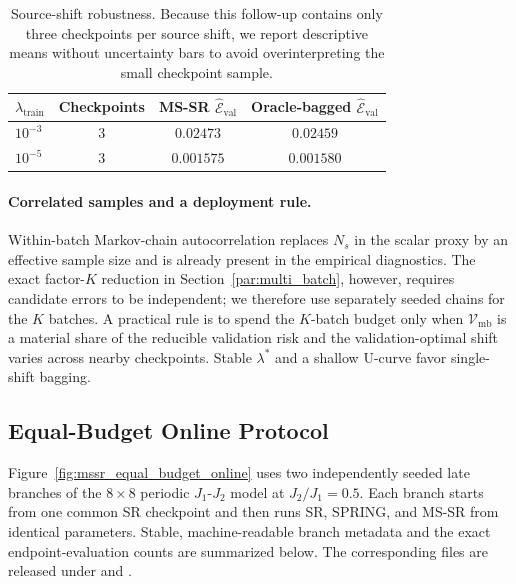 \begin{table}[h]
\centering
\small
\begin{tabular}{lccc}
\toprule
$\lambda_{\mathrm{train}}$ & Checkpoints
  & MS-SR $\widehat{\mathcal E}_{\mathrm{val}}$
  & Oracle-bagged $\widehat{\mathcal E}_{\mathrm{val}}$ \\
\midrule
$10^{-3}$ & 3 & $0.02473$ & $0.02459$ \\
$10^{-5}$ & 3 & $0.001575$ & $0.001580$ \\
\bottomrule
\end{tabular}
\caption{Source-shift robustness. Because this follow-up contains only three
checkpoints per source shift, we report descriptive means without uncertainty
bars to avoid overinterpreting the small checkpoint sample.}
\label{tab:mssr_source_shift_robustness}
\end{table}

\paragraph{Correlated samples and a deployment rule.}
Within-batch Markov-chain autocorrelation replaces $N_s$ in the scalar proxy by
an effective sample size and is already present in the empirical diagnostics.
The exact factor-$K$ reduction in Section~\ref{par:multi_batch}, however,
requires candidate errors to be independent; we therefore use separately
seeded chains for the $K$ batches. A practical rule is to spend the $K$-batch
budget only when $\mathcal V_{\mathrm{mb}}$ is a material share of the
reducible validation risk and the validation-optimal shift varies across nearby
checkpoints. Stable $\lambda^*$ and a shallow U-curve favor single-shift
bagging.

\subsection{Equal-Budget Online Protocol}\label{app:mssr_online}

Figure~\ref{fig:mssr_equal_budget_online} uses two independently seeded late
branches of the $8\times8$ periodic $J_1$-$J_2$ model at $J_2/J_1=0.5$.
Each branch starts from one common SR checkpoint and then runs SR, SPRING, and
MS-SR from identical parameters. Stable, machine-readable branch metadata and
the exact endpoint-evaluation counts are summarized below. The corresponding
files are released under  and
.

